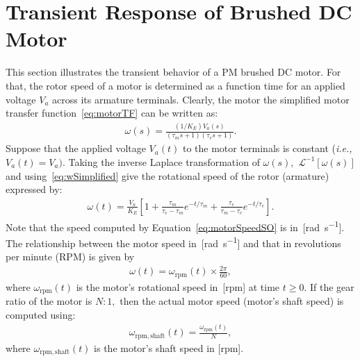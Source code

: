 \section{Transient Response of Brushed DC Motor}
\label{sec:motorShaftspeedTransient}
This section illustrates the transient behavior of a PM brushed DC motor. For that, the rotor speed of a motor is determined as a function time for an applied voltage $V_a$ across its armature terminals. Clearly, the motor the simplified motor transfer function~\eqref{eq:motorTF} can be written as: %
%
\begin{align}
  \omega(s) = \frac{\left(1/K_E\right)V_a(s)}{(\tau_ms+1)(\tau_es+1)}.
  \label{eq:wSimplified}
\end{align}
%
Suppose that the applied voltage $V_a(t)$ to the motor terminals is constant (\textit{i.e.,} $V_a(t) = V_a).$ Taking the inverse Laplace transformation of $\omega(s),$ $\mathscr{L}^{-1}[\omega(s)]$ and using~\eqref{eq:wSimplified}  give the rotational speed of the rotor (armature)  expressed by: %
%
\begin{align}
  \omega(t) = \frac{V_a}{K_E}\left[1 + \frac{\tau_m}{\tau_e-\tau_m}e^{-t/\tau_m}+\frac{\tau_e}{\tau_m-\tau_e}e^{-t/\tau_e}\right].
  \label{eq:motorSpeedSO}
\end{align}
%
%
Note that the speed computed by Equation~\eqref{eq:motorSpeedSO} is in~[\si{\radian\per\second}]. The relationship between the motor speed in~[\si{\radian\per\second}] and that in revolutions per minute (RPM) is given by %
%
\begin{align}
  \omega(t) = \omega_{\mathrm{rpm}}(t) \times \frac{2\pi}{60},
  \label{eq:speedConversion}
\end{align}
%
where $\omega_{\mathrm{rpm}}(t)$ is the motor's rotational speed in~[rpm] at time $t\ge 0.$ If the gear ratio of the motor is $N:1,$ then the actual motor speed (motor's shaft speed) is computed using: %
%
\begin{align}
  \omega_{\mathrm{rpm,shaft}}(t) = \frac{\omega_{\mathrm{rpm}}(t)}{N},
  \label{eq:shaftSpeed}
\end{align}
%
where $\omega_{\mathrm{rpm,shaft}}(t)$ is the motor's shaft speed in [rpm]. 
%  
%

